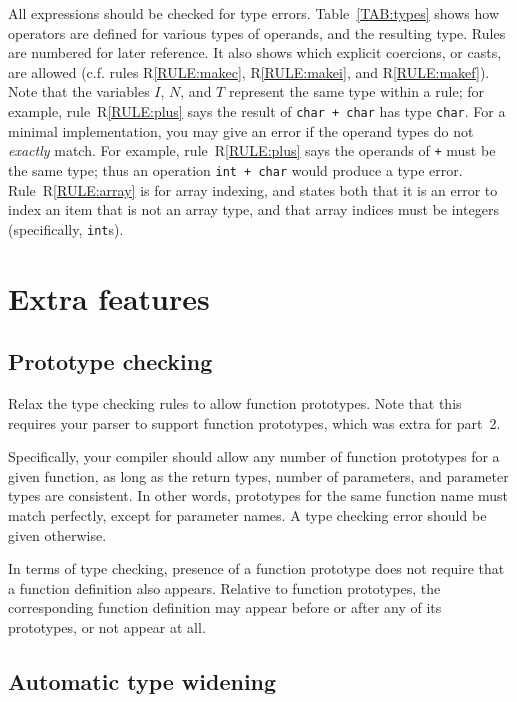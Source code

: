 \documentclass{article}
\newcounter{rule}
\newcommand{\parser}{2}
\begin{document}
All expressions should be checked for type errors.
Table~\ref{TAB:types} shows
how operators are defined for various types of operands,
and the resulting type.
Rules are numbered for later reference.
It also shows which explicit coercions, or casts, are allowed
(c.f. rules R\ref{RULE:makec}, R\ref{RULE:makei}, and R\ref{RULE:makef}).
Note that the variables $I$, $N$, and $T$ represent the same type
within a rule;
for example,
  rule~R\ref{RULE:plus} says the result of
  {\tt char + char} has type {\tt char}.
For a minimal implementation,
you may give an error if the operand types
do not \emph{exactly} match.
For example,
  rule~R\ref{RULE:plus} says the operands of {\tt +} must be
  the same type;
  thus an operation {\tt int + char} would produce a type error.
Rule~R\ref{RULE:array} is for array indexing,
and states both that
  it is an error to index an item that is not an array type,
  and that
  array indices must be integers (specifically, {\tt int}s).


\section{Extra features}
\label{SEC:extras}

\subsection{Prototype checking}
\label{SEC:protos}

Relax the type checking rules to allow function prototypes.
Note that this requires your parser to support function prototypes,
which was extra for part~\parser.

Specifically,
your compiler should allow any number of function prototypes
for a given function, as long as the return types,
number of parameters, and parameter types are consistent.
In other words, prototypes for the same function name
must match perfectly, except for parameter names.
A type checking error should be given otherwise.

In terms of type checking,
presence of a function prototype does not require that a
function definition also appears.
Relative to function prototypes,
the corresponding function definition may
appear before or after any of its prototypes,
or not appear at all.

\subsection{Automatic type widening}
\label{SEC:widening}
\end{document}
